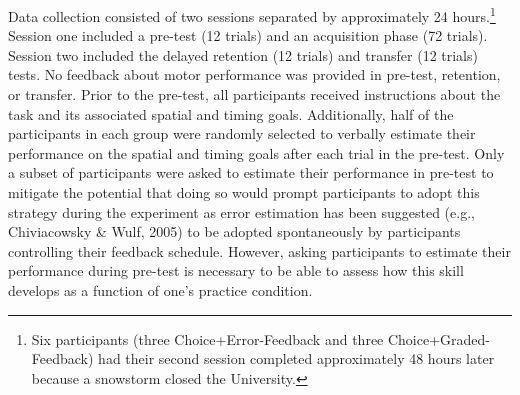 \documentclass[
  doc, donotrepeattitle,floatsintext]{apa7}
\begin{document}
Data collection consisted of two sessions separated by approximately 24 hours.\footnote{Six participants (three Choice+Error-Feedback and three Choice+Graded-Feedback) had their second session completed approximately 48 hours later because a snowstorm closed the University.} Session one included a pre-test (12 trials) and an acquisition phase (72 trials). Session two included the delayed retention (12 trials) and transfer (12 trials) tests. No feedback about motor performance was provided in pre-test, retention, or transfer. Prior to the pre-test, all participants received instructions about the task and its associated spatial and timing goals. Additionally, half of the participants in each group were randomly selected to verbally estimate their performance on the spatial and timing goals after each trial in the pre-test. Only a subset of participants were asked to estimate their performance in pre-test to mitigate the potential that doing so would prompt participants to adopt this strategy during the experiment as error estimation has been suggested (e.g., Chiviacowsky \& Wulf, 2005) to be adopted spontaneously by participants controlling their feedback schedule. However, asking participants to estimate their performance during pre-test is necessary to be able to assess how this skill develops as a function of one's practice condition.
\end{document}
